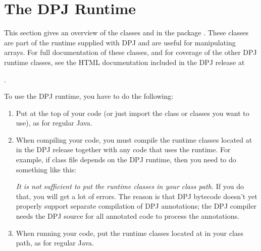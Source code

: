 \section{The DPJ Runtime%
\label{sec:runtime}}

This section gives an overview of the classes  and
 in the package .  These classes are
part of the runtime supplied with DPJ and are useful for manipulating
arrays.  For full documentation of these classes, and for coverage of
the other DPJ runtime classes, see the HTML documentation included in
the DPJ release at 
%
\begin{description}
\item {}.
\end{description}

To use the DPJ runtime, you have to do the following:
%
\begin{enumerate}
%
\item Put  at the top of your code (or just
  import the class or classes you want to use), as for regular Java.
%
\item When compiling your code, you must compile the runtime classes
  located at  in the DPJ release
  together with any code that uses the runtime.  For example, if class
  file  depends on the DPJ runtime, then you need to do
  something like this:
%
%
\emph{It is not sufficient to put the runtime classes in your class
  path.}  If you do that, you will get a lot of errors.  The reason is
that DPJ bytecode doesn't yet properly support separate compilation of
DPJ annotations; the DPJ compiler needs the DPJ source for all
annotated code to process the annotations.
%
\item When running your code, put the runtime classes located at
   in your class path, as for
  regular Java.
%
\end{enumerate}

\subsection{%
\label{sec:runtime:array}}

